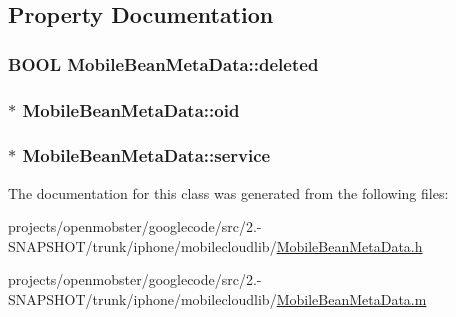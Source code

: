 \subsection{\-Property \-Documentation}
\hypertarget{interface_mobile_bean_meta_data_ab691f741ac2f8586e8cee395fa14ec9b}{
\subsubsection[{deleted}]{\setlength{\rightskip}{0pt plus 5cm}\-B\-O\-O\-L \-Mobile\-Bean\-Meta\-Data\-::deleted}}
\label{interface_mobile_bean_meta_data_ab691f741ac2f8586e8cee395fa14ec9b}
\hypertarget{interface_mobile_bean_meta_data_aaf38f1170c640abeea172c9d97296bec}{
\subsubsection[{oid}]{ $\ast$ \-Mobile\-Bean\-Meta\-Data\-::oid}}
\label{interface_mobile_bean_meta_data_aaf38f1170c640abeea172c9d97296bec}
\hypertarget{interface_mobile_bean_meta_data_a92020136f5c9b890d273a4bffc79041f}{
\subsubsection[{service}]{ $\ast$ \-Mobile\-Bean\-Meta\-Data\-::service}}
\label{interface_mobile_bean_meta_data_a92020136f5c9b890d273a4bffc79041f}


\-The documentation for this class was generated from the following files\-:\begin{DoxyCompactItemize}
\item 
projects/openmobster/googlecode/src/2.-\/\-S\-N\-A\-P\-S\-H\-O\-T/trunk/iphone/mobilecloudlib/\hyperlink{_mobile_bean_meta_data_8h}{\-Mobile\-Bean\-Meta\-Data.\-h}\item 
projects/openmobster/googlecode/src/2.-\/\-S\-N\-A\-P\-S\-H\-O\-T/trunk/iphone/mobilecloudlib/\hyperlink{_mobile_bean_meta_data_8m}{\-Mobile\-Bean\-Meta\-Data.\-m}\end{DoxyCompactItemize}
